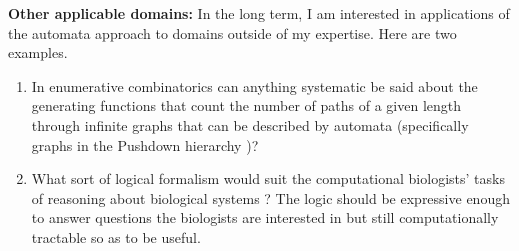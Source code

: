 \documentclass[12pt]{article}
\theoremstyle{plain} \numberwithin{equation}{section}
\theoremstyle{definition}
\begin{document}


{\bf Other applicable domains:} In the long term, I am interested in applications of the automata approach to domains outside of my expertise. Here are two examples.
\begin{enumerate}
\item In enumerative combinatorics can anything systematic be said about the generating functions that count the number of paths of a given length through infinite graphs that can be described by automata (specifically graphs in the Pushdown hierarchy \cite{Thom03})? 
\item What sort of logical formalism would suit the computational biologists' tasks of reasoning about biological systems \cite{Hare04, FiHe06}? The logic should be expressive enough to answer questions the biologists are interested in but still computationally tractable so as to be useful.
\end{enumerate}


\end{document}
